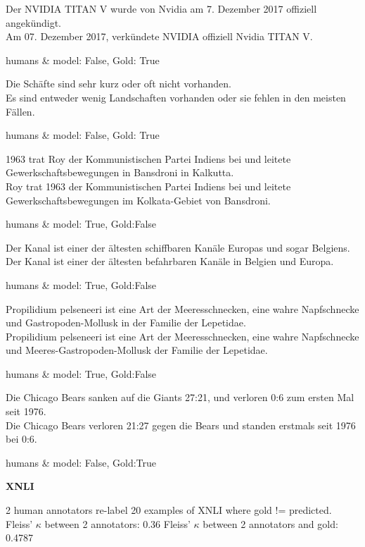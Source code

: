 \begin{examples}
  \item Der NVIDIA TITAN V wurde von Nvidia am 7. Dezember 2017 offiziell angekündigt.\\
        Am 07. Dezember 2017, verkündete NVIDIA offiziell Nvidia TITAN V.

        humans \& model: False, Gold: True
  \item Die Schäfte sind sehr kurz oder oft nicht vorhanden.\\
        Es sind entweder wenig Landschaften vorhanden oder sie fehlen in den meisten Fällen.

        humans \& model: False, Gold: True
  \item 1963 trat Roy der Kommunistischen Partei Indiens bei und leitete Gewerkschaftsbewegungen in Bansdroni in Kalkutta.\\
        Roy trat 1963 der Kommunistischen Partei Indiens bei und leitete Gewerkschaftsbewegungen im Kolkata-Gebiet von Bansdroni.

        humans \& model: True, Gold:False
  \item Der Kanal ist einer der ältesten schiffbaren Kanäle Europas und sogar Belgiens.\\
        Der Kanal ist einer der ältesten befahrbaren Kanäle in Belgien und Europa.

        humans \& model: True, Gold:False
  \item Propilidium pelseneeri ist eine Art der Meeresschnecken, eine wahre Napfschnecke und Gastropoden-Mollusk in der Familie der Lepetidae.\\
        Propilidium pelseneeri ist eine Art der Meeresschnecken, eine wahre Napfschnecke und Meeres-Gastropoden-Mollusk der Familie der Lepetidae.

        humans \& model: True, Gold:False
  \item Die Chicago Bears sanken auf die Giants 27:21, und verloren 0:6 zum ersten Mal seit 1976.\\
        Die Chicago Bears verloren 21:27 gegen die Bears und standen erstmals seit 1976 bei 0:6.

        humans \& model: False, Gold:True
\end{examples}


\textbf{XNLI}

2 human annotators re-label 20 examples of XNLI where gold != predicted.
Fleiss' $\kappa$ between 2 annotators: 0.36
Fleiss' $\kappa$ between 2 annotators and gold: 0.4787

